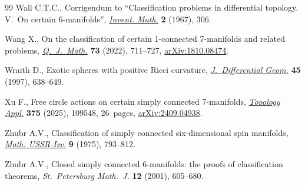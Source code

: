 \begin{thebibliography}{99}
Wall C.T.C., Corrigendum to ``Classification problems in differential topology.
  {V}.~{O}n certain {$6$}-manifolds'',
  \href{https://doi.org/10.1007/BF01425407}{\textit{Invent. Math.}} \textbf{2}
  (1967), 306.

Wang X., On the classification of certain 1-connected 7-manifolds and related
  problems, \href{https://doi.org/10.1093/qmath/haab053}{\textit{Q.~J.~Math.}}
  \textbf{73} (2022), 711--727,
  \href{https://arxiv.org/abs/1810.08474}{arXiv:1810.08474}.

Wraith D., Exotic spheres with positive {R}icci curvature,
  \href{https://doi.org/10.4310/jdg/1214459846}{\textit{J.~Differential Geom.}}
  \textbf{45} (1997), 638--649.

Xu F., Free circle actions on certain simply connected 7-manifolds,
  \href{https://doi.org/10.1016/j.topol.2025.109548}{\textit{Topology Appl.}}
  \textbf{375} (2025), 109548, 26~pages,
  \href{https://arxiv.org/abs/2409.04938}{arXiv:2409.04938}.

Zhubr A.V., Classification of simply connected six-dimensional spin manifolds,
  \href{https://doi.org/10.1070/IM1975v009n04ABEH001498}{\textit{Math.
  USSR-Izv.}} \textbf{9} (1975), 793--812.

Zhubr A.V., Closed simply connected 6-manifolds: the proofs of classification
  theorems, \textit{St.~Petersburg Math.~J.} \textbf{12} (2001), 605--680.

\end{thebibliography}
